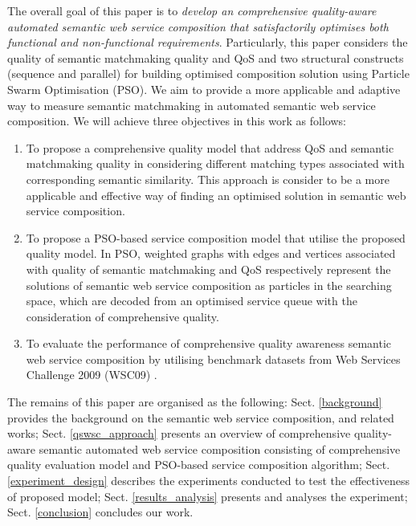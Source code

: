 \documentclass{llncs}
\begin{document}
The overall goal of this paper is to \textit{develop an comprehensive quality-aware automated semantic web service composition that satisfactorily optimises both functional and non-functional requirements}. Particularly, this paper considers the quality of semantic matchmaking quality and QoS and two structural constructs (sequence and parallel) for building optimised composition solution using Particle Swarm Optimisation (PSO). We aim to provide a more applicable and adaptive way to measure semantic matchmaking in automated semantic web service composition. We will achieve three objectives in this work as follows:

\begin{enumerate}
 \item To propose a comprehensive quality model that address QoS and semantic matchmaking quality in considering different matching types associated with corresponding semantic similarity. This approach is consider to be a more applicable and effective way of finding an optimised solution in semantic web service composition.
  
 \item To propose a PSO-based service composition model that utilise the proposed quality model. In PSO, weighted graphs with edges and vertices associated with quality of semantic matchmaking and QoS respectively represent the solutions of semantic web service composition as particles in the searching space, which are decoded from an optimised service queue with the consideration of comprehensive quality.
  
 \item To evaluate the performance of comprehensive quality awareness semantic web service composition by utilising benchmark datasets from Web Services Challenge 2009 (WSC09) \cite{kona2009wsc}.
\end{enumerate}

The remains of this paper are organised as the following: Sect. \ref{background} provides the background on the semantic web service composition, and related works; Sect. \ref{qswsc_approach} presents an overview of comprehensive quality-aware semantic automated web service composition consisting of comprehensive quality evaluation model and PSO-based service composition algorithm; Sect. \ref{experiment_design} describes the experiments conducted to test the effectiveness of proposed model; Sect. \ref{results_analysis} presents and analyses the experiment; Sect. \ref{conclusion} concludes our work.
\end{document}
